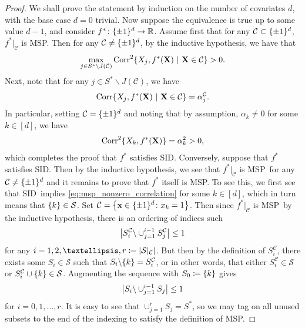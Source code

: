 \documentclass[11pt]{article}
\newcommand{\bx}{\mathbf{x}}
\newcommand{\bX}{\mathbf{X}}
\DeclarePairedDelimiter{\braces}{\lbrace}{\rbrace}
\DeclarePairedDelimiter{\abs}{|}{|}
\newcommand{\R}{\mathbb{R}}
\newcommand{\cell}{\mathcal{C}}
\newcommand{\binspace}{\braces{\pm 1}^\nfeats}
\newcommand{\nfeats}{d}
\newcommand{\coordindices}{[\nfeats]}
\newcommand{\cellfeatindices}{J}
\newcommand{\MSP}{\textsf{MSP}}
\newcommand{\SID}{\textsf{SID}}
\newcommand{\suppset}{S^*}
\newcommand{\fcoefs}{\mathcal{S}}
\newcommand{\Corr}{\operatorname{Corr}}
\begin{document}
\begin{proof}
    We shall prove the statement by induction on the number of covariates $\nfeats$, with the base case $\nfeats = 0$ trivial.
    Now suppose the equivalence is true up to some value $\nfeats-1$, and consider $f^* \colon \binspace \to \R$.
    Assume first that for any $\cell \subset \binspace$, $f^*|_\cell$ is \MSP.
    Then for any $\cell \neq \binspace$, by the inductive hypothesis, we have that
    \begin{equation}
        \max_{j \in \suppset\backslash \cellfeatindices(\cell)}\Corr^2\braces*{X_j, f^*(\bX)~|~\bX \in \cell} > 0.
    \end{equation}
    Next, note that for any $j \in \suppset\backslash\cellfeatindices(\cell)$, we have
    \begin{equation}
        \Corr\braces*{X_j,f^*(\bX)~|~\bX \in \cell} = \alpha_{j}^\cell.
    \end{equation}
    In particular, setting $\cell = \binspace$ and noting that by assumption, $\alpha_k \neq 0$ for some $k \in \coordindices$, we have
    \begin{equation} \label{eq:msp_nonzero_correlation}
        \Corr^2\braces*{X_k,f^*(\bX)} = \alpha_k^2 > 0,
    \end{equation}
    which completes the proof that $f^*$ satisfies \SID.
    Conversely, suppose that $f^*$ satisfies \SID.
    Then by the inductive hypothesis, we see that $f^*|_\cell$ is \MSP~for any $\cell \neq \binspace$ and it remains to prove that $f^*$ itself is \MSP.
    To see this, we first see that \SID~implies \eqref{eq:msp_nonzero_correlation} for some $k \in \coordindices$, which in turn means that $\braces{k} \in \fcoefs$.
    Set $\cell = \braces*{\bx \in \binspace \colon x_k = 1}$.
    Then since $f^*|_\cell$ is \MSP~by the inductive hypothesis, there is an ordering of indices such
    \begin{equation}
        \abs*{S_i^\cell\backslash\cup_{j=1}^{i-1}S_j^\cell} \leq 1
    \end{equation}
    for any $i=1,2,\ldots,r \coloneqq \abs*{\fcoefs|_\cell}$.
    But then by the definition of $S^\cell_i$, there exists some $S_i \in \fcoefs$ such that $S_i \backslash\braces*{k} = S^\cell_i$, or in other words, that either $S_i^\cell \in \fcoefs$ or $S_i^\cell\cup\braces*{k} \in \fcoefs$.
    Augmenting the sequence with $S_0 \coloneqq \braces{k}$ gives
    \begin{equation}
        \abs*{S_i\backslash\cup_{j=1}^{i-1}S_j} \leq 1
    \end{equation}
    for $i=0,1,\ldots,r$.
    It is easy to see that $\cup_{j=1}^r S_j = \suppset$, so we may tag on all unused subsets to the end of the indexing to satisfy the definition of \MSP.
\end{proof}
\end{document}

